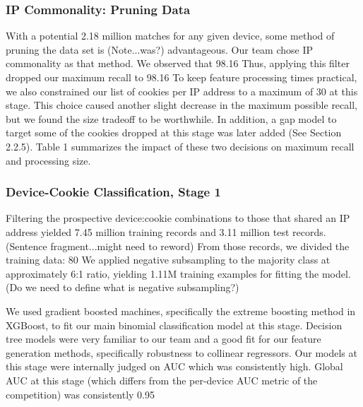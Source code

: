 \documentclass[9pt, journal]{IEEEtran}
\begin{document}
\subsubsection{IP Commonality: Pruning Data}

With a potential 2.18 million matches for any given device, some method of pruning the data set is (Note...was?) advantageous. 
Our team chose IP commonality as that method. We observed that 98.16%
Thus, applying this filter dropped our maximum recall to 98.16%
To keep feature processing times practical, we also constrained our list of cookies per IP address to a maximum of 30 at this stage.
This choice caused another slight decrease in the maximum possible recall, but we found the size tradeoff to be worthwhile. In addition, a gap model to target some of the cookies dropped at this stage was later added (See Section 2.2.5). 
Table 1 summarizes the impact of these two decisions on maximum recall and processing size.  

\subsubsection{Device-Cookie Classification, Stage 1}
Filtering the prospective device:cookie combinations to those that shared an IP address yielded 7.45 million training records and 3.11 million test records. (Sentence fragment...might need to reword)
From those records, we divided the training data: 80%
We applied negative subsampling to the majority class at approximately 6:1 ratio, yielding 1.11M training examples for fitting the model. (Do we need to define what is negative subsampling?)

We used gradient boosted machines, specifically the extreme boosting method in XGBoost, to fit our main binomial classification model at this stage.
Decision tree models were very familiar to our team and a good fit for our feature generation methods, specifically robustness to collinear regressors. 
Our models at this stage were internally judged on AUC which was consistently high. Global AUC at this stage (which differs from the per-device AUC metric of the competition) was consistently 0.95
\end{document}
